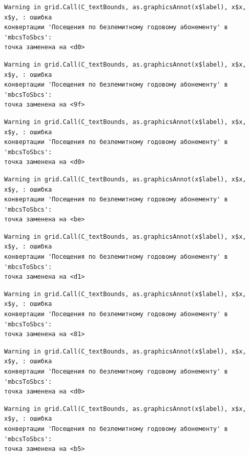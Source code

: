 \documentclass[
  letterpaper,
  DIV=11,
  numbers=noendperiod]{scrreprt}
\begin{document}
\begin{verbatim}
Warning in grid.Call(C_textBounds, as.graphicsAnnot(x$label), x$x, x$y, : ошибка
конвертации 'Посещения по безлемитному годовому абонементу' в 'mbcsToSbcs':
точка заменена на <d0>
\end{verbatim}

\begin{verbatim}
Warning in grid.Call(C_textBounds, as.graphicsAnnot(x$label), x$x, x$y, : ошибка
конвертации 'Посещения по безлемитному годовому абонементу' в 'mbcsToSbcs':
точка заменена на <9f>
\end{verbatim}

\begin{verbatim}
Warning in grid.Call(C_textBounds, as.graphicsAnnot(x$label), x$x, x$y, : ошибка
конвертации 'Посещения по безлемитному годовому абонементу' в 'mbcsToSbcs':
точка заменена на <d0>
\end{verbatim}

\begin{verbatim}
Warning in grid.Call(C_textBounds, as.graphicsAnnot(x$label), x$x, x$y, : ошибка
конвертации 'Посещения по безлемитному годовому абонементу' в 'mbcsToSbcs':
точка заменена на <be>
\end{verbatim}

\begin{verbatim}
Warning in grid.Call(C_textBounds, as.graphicsAnnot(x$label), x$x, x$y, : ошибка
конвертации 'Посещения по безлемитному годовому абонементу' в 'mbcsToSbcs':
точка заменена на <d1>
\end{verbatim}

\begin{verbatim}
Warning in grid.Call(C_textBounds, as.graphicsAnnot(x$label), x$x, x$y, : ошибка
конвертации 'Посещения по безлемитному годовому абонементу' в 'mbcsToSbcs':
точка заменена на <81>
\end{verbatim}

\begin{verbatim}
Warning in grid.Call(C_textBounds, as.graphicsAnnot(x$label), x$x, x$y, : ошибка
конвертации 'Посещения по безлемитному годовому абонементу' в 'mbcsToSbcs':
точка заменена на <d0>
\end{verbatim}

\begin{verbatim}
Warning in grid.Call(C_textBounds, as.graphicsAnnot(x$label), x$x, x$y, : ошибка
конвертации 'Посещения по безлемитному годовому абонементу' в 'mbcsToSbcs':
точка заменена на <b5>
\end{verbatim}
\end{document}
